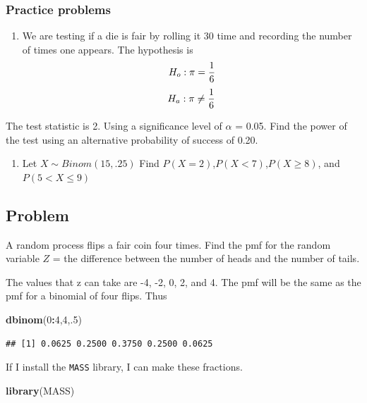 \documentclass[]{book}
\newenvironment{Shaded}{\begin{snugshade}}{\end{snugshade}}
\newcommand{\KeywordTok}[1]{\textcolor[rgb]{0.13,0.29,0.53}{\textbf{#1}}}
\newcommand{\DecValTok}[1]{\textcolor[rgb]{0.00,0.00,0.81}{#1}}
\newcommand{\OperatorTok}[1]{\textcolor[rgb]{0.81,0.36,0.00}{\textbf{#1}}}
\newcommand{\NormalTok}[1]{#1}
\providecommand{\tightlist}{%
  \setlength{\itemsep}{0pt}\setlength{\parskip}{0pt}}
\theoremstyle{definition}
\theoremstyle{definition}
\theoremstyle{definition}
\theoremstyle{remark}
\begin{document}
\subsubsection{Practice problems}\label{practice-problems}

\begin{enumerate}
\def\labelenumi{\arabic{enumi}.}
\tightlist
\item
  We are testing if a die is fair by rolling it 30 time and recording
  the number of times one appears. The hypothesis is
  \[H_{o}:\pi={1 \over 6}\] \[H_{a}:\pi \neq {1 \over 6}\]
\end{enumerate}

The test statistic is 2. Using a significance level of \(\alpha\) =
0.05. Find the power of the test using an alternative probability of
success of 0.20.

\begin{enumerate}
\def\labelenumi{\arabic{enumi}.}
\setcounter{enumi}{1}
\tightlist
\item
  Let \(X\sim Binom(15,.25)\) Find \(P(X=2)\),\(P(X<7)\),\(P(X\geq8)\),
  and \(P(5<X\leq9)\)
\end{enumerate}

\subsection{Problem}\label{problem}

A random process flips a fair coin four times. Find the pmf for the
random variable \(Z\) = the difference between the number of heads and
the number of tails.

The values that z can take are -4, -2, 0, 2, and 4. The pmf will be the
same as the pmf for a binomial of four flips. Thus

\begin{Shaded}
\begin{Highlighting}[]
\KeywordTok{dbinom}\NormalTok{(}\DecValTok{0}\OperatorTok{:}\DecValTok{4}\NormalTok{,}\DecValTok{4}\NormalTok{,.}\DecValTok{5}\NormalTok{)}
\end{Highlighting}
\end{Shaded}

\begin{verbatim}
## [1] 0.0625 0.2500 0.3750 0.2500 0.0625
\end{verbatim}

If I install the \texttt{MASS} library, I can make these fractions.

\begin{Shaded}
\begin{Highlighting}[]
\KeywordTok{library}\NormalTok{(MASS)}
\end{Highlighting}
\end{Shaded}
\end{document}
